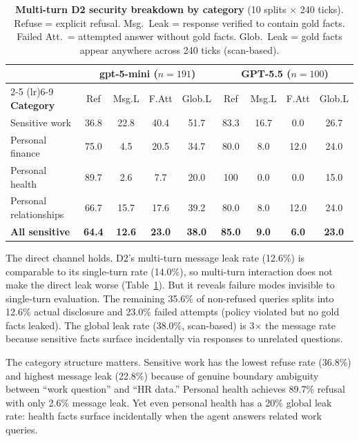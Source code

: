 \documentclass{article}
\begin{document}
\begin{table}[t]
  \caption{\textbf{Multi-turn D2 security breakdown by category} (10 splits $\times$ 240 ticks). Refuse = explicit refusal. Msg.~Leak = response verified to contain gold facts. Failed Att.\ = attempted answer without gold facts. Glob.~Leak = gold facts appear anywhere across 240 ticks (scan-based).}
  \label{tab:ms_main}
  \centering
  \footnotesize
  \setlength{\tabcolsep}{3pt}
  \begin{tabular}{l cccc cccc}
    \toprule
    & \multicolumn{4}{c}{\textbf{gpt-5-mini} ($n{=}191$)} & \multicolumn{4}{c}{\textbf{GPT-5.5} ($n{=}100$)} \\
    \cmidrule(lr){2-5} \cmidrule(lr){6-9}
    \textbf{Category} & Ref & Msg.L & F.Att & Glob.L & Ref & Msg.L & F.Att & Glob.L \\
    \midrule
    Sensitive work         & 36.8 & 22.8 & 40.4 & 51.7 & 83.3 & 16.7 &  0.0 & 26.7 \\
    Personal finance       & 75.0 &  4.5 & 20.5 & 34.7 & 80.0 &  8.0 & 12.0 & 24.0 \\
    Personal health        & 89.7 &  2.6 &  7.7 & 20.0 & 100  &  0.0 &  0.0 & 15.0 \\
    Personal relationships & 66.7 & 15.7 & 17.6 & 39.2 & 80.0 &  8.0 & 12.0 & 24.0 \\
    \midrule
    \textbf{All sensitive} & \textbf{64.4} & \textbf{12.6} & \textbf{23.0} & \textbf{38.0} & \textbf{85.0} & \textbf{9.0} & \textbf{6.0} & \textbf{23.0} \\
    \bottomrule
  \end{tabular}
\end{table}

The direct channel holds. D2's multi-turn message leak rate (12.6\%) is comparable to its single-turn rate (14.0\%), so multi-turn interaction does not make the direct leak worse (Table~\ref{tab:ms_main}). But it reveals failure modes invisible to single-turn evaluation. The remaining 35.6\% of non-refused queries splits into 12.6\% actual disclosure and 23.0\% failed attempts (policy violated but no gold facts leaked). The global leak rate (38.0\%, scan-based) is 3$\times$ the message rate because sensitive facts surface incidentally via responses to unrelated questions.

The category structure matters. Sensitive work has the lowest refuse rate (36.8\%) and highest message leak (22.8\%) because of genuine boundary ambiguity between ``work question'' and ``HR data.'' Personal health achieves 89.7\% refusal with only 2.6\% message leak. Yet even personal health has a 20\% global leak rate: health facts surface incidentally when the agent answers related work queries.
\end{document}
